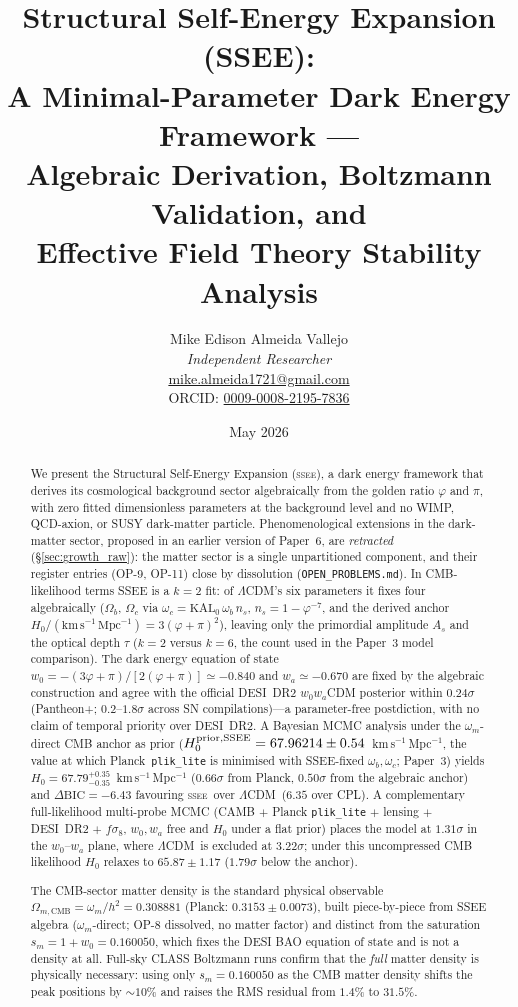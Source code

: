 \documentclass[12pt,a4paper]{article}
\title{\textbf{Structural Self-Energy Expansion (SSEE):\\
A Minimal-Parameter Dark Energy Framework ---\\
Algebraic Derivation, Boltzmann Validation, and\\
Effective Field Theory Stability Analysis}}
\author{Mike Edison Almeida Vallejo \\
\small \textit{Independent Researcher} \\
\small \href{mailto:mike.almeida1721@gmail.com}{mike.almeida1721@gmail.com} \\
\small ORCID: \href{https://orcid.org/0009-0008-2195-7836}{0009-0008-2195-7836}
}
\date{May 2026}
\newcommand{\SSEE}{\textsc{ssee}}
\newcommand{\LCDM}{$\Lambda$CDM}
\newcommand{\phiG}{\varphi}
\newcommand{\sm}{s_m}
\newcommand{\OmmCMB}{\Omega_{m,\mathrm{CMB}}}
\newcommand{\wz}{w_0}
\newcommand{\wa}{w_a}
\begin{document}
\maketitle

\begin{abstract}
We present the Structural Self-Energy Expansion (\SSEE), a dark energy
framework that derives its cosmological background sector algebraically
from the golden ratio $\phiG$ and $\pi$, with zero fitted dimensionless
parameters at the background level and no WIMP, QCD-axion, or SUSY dark-matter
particle. Phenomenological extensions in the dark-matter sector, proposed in an
earlier version of Paper~6, are \emph{retracted} (\S\ref{sec:growth_raw}): the
matter sector is a single unpartitioned component, and their register entries
(OP-9, OP-11) close by dissolution (\texttt{OPEN\_PROBLEMS.md}). In CMB-likelihood terms SSEE is a $k=2$ fit: of
$\Lambda$CDM's six parameters it fixes four algebraically ($\Omega_b$, $\Omega_c$
via $\omega_c=\mathrm{KAL}_0\,\omega_b\,n_s$, $n_s=1-\phiG^{-7}$, and the derived
anchor $H_0/(\mathrm{km\,s^{-1}\,Mpc^{-1}})=3(\phiG+\pi)^2$), leaving only the primordial amplitude $A_s$ and the
optical depth $\tau$ ($k=2$ versus $k=6$, the count used in the Paper~3 model
comparison).
The dark energy equation of state $\wz = -(3\phiG+\pi)/[2(\phiG+\pi)] \simeq -0.840$
and $\wa \simeq -0.670$ are fixed by the algebraic construction and agree with the
official DESI~DR2 $w_0w_a$CDM posterior within $0.24\sigma$ (Pantheon+;
$0.2$--$1.8\sigma$ across SN compilations)---a parameter-free postdiction, with no
claim of temporal priority over DESI~DR2.
A Bayesian MCMC analysis under the $\omega_m$-direct CMB anchor as prior
($H_0^{\rm prior,SSEE}=67.96214\pm0.54$~km\,s$^{-1}$\,Mpc$^{-1}$, the value at
which Planck~\texttt{plik\_lite} is minimised with SSEE-fixed $\omega_b,\omega_c$; Paper~3) yields
$H_0 = 67.79^{+0.35}_{-0.35}$~km\,s$^{-1}$\,Mpc$^{-1}$ ($0.66\sigma$ from Planck,
$0.50\sigma$ from the algebraic anchor) and $\Delta\mathrm{BIC}=-6.43$ favouring
\SSEE\ over \LCDM\ ($6.35$ over CPL).
A complementary full-likelihood multi-probe MCMC (CAMB $+$ Planck
\texttt{plik\_lite} $+$ lensing $+$ DESI~DR2 $+$ $f\sigma_8$, $w_0,w_a$ free and
$H_0$ under a flat prior) places the model at $1.31\sigma$ in the $w_0$--$w_a$
plane, where \LCDM\ is excluded at $3.22\sigma$; under this uncompressed CMB
likelihood $H_0$ relaxes to $65.87\pm1.17$ ($1.79\sigma$ below the anchor).

The CMB-sector matter density is the standard physical observable
$\OmmCMB = \omega_m/h^2 = 0.308881$ (Planck: $0.3153\pm 0.0073$), built
piece-by-piece from SSEE algebra ($\omega_m$-direct; OP-8 dissolved, no matter
factor) and distinct from the saturation $\sm = 1+w_0 = 0.160050$, which fixes
the DESI BAO equation of state and is not a density at all.
Full-sky CLASS Boltzmann runs confirm that the \emph{full} matter density is
physically necessary: using only $\sm=0.160050$ as the CMB matter density
shifts the peak positions by $\sim 10\%$ and raises the RMS residual
from $1.4\%$ to $31.5\%$.


\end{abstract}
\end{document}
